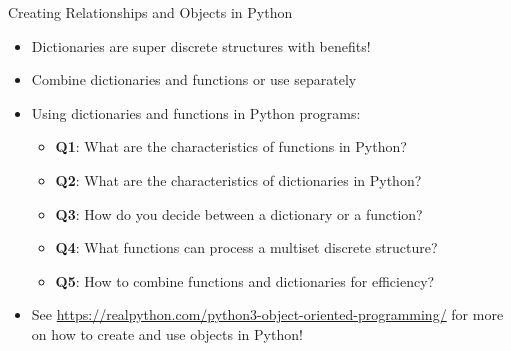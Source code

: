 \documentclass[14pt,aspectratio=169]{beamer}
\begin{document}
%
\begin{frame}{Creating Relationships and Objects in Python}
  \begin{itemize}
    \item Dictionaries are super discrete structures with benefits!
      \vspace*{-.2in}
    \item Combine dictionaries and functions or use separately
      \vspace*{-.2in}
    \item Using dictionaries and functions in Python programs:
      \begin{itemize}
        \item {\bf Q1}: What are the characteristics of functions in Python?
        \item {\bf Q2}: What are the characteristics of dictionaries in Python?
        \item {\bf Q3}: How do you decide between a dictionary or a function?
        \item {\bf Q4}: What functions can process a multiset discrete
          structure?
        \item {\bf Q5}: How to combine functions and dictionaries for
          efficiency?
      \end{itemize}
      \vspace*{-.2in}
    \item See \url{https://realpython.com/python3-object-oriented-programming/}
      for more on how to create and use objects in Python!
  \end{itemize}
\end{frame}
\end{document}
